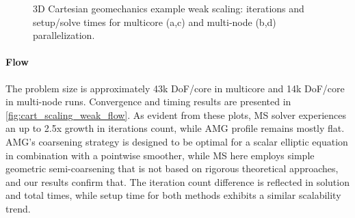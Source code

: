 \begin{figure} [htbp]
  \begin{subfigure}[t]{0.48\textwidth}
    \centering
    
    \caption{}
    \label{fig:cart_scaling_weak_mech_omp_iter}
  \end{subfigure}
  \hfill
  \begin{subfigure}[t]{0.48\textwidth}
    \centering
    
    \caption{}
    \label{fig:cart_scaling_weak_mech_mpi_iter}
  \end{subfigure}
  \par\bigskip 
  \begin{subfigure}[t]{0.48\textwidth}
    \centering
    
    \caption{}
    \label{fig:cart_scaling_weak_mech_omp_time}
  \end{subfigure}
  \hfill
  \begin{subfigure}[t]{0.48\textwidth}
    \centering
    
    \caption{}
    \label{fig:cart_scaling_weak_mech_mpi_time}
  \end{subfigure}
  \caption[3D Cartesian geomechanics example weak scaling]{3D Cartesian geomechanics example weak scaling: iterations and setup/solve times for multicore (a,c) and multi-node (b,d) parallelization.}
  \label{fig:cart_scaling_weak_mech}
\end{figure}

\paragraph{Flow}
The problem size is approximately 43k DoF/core in multicore and 14k DoF/core in multi-node runs.   Convergence and timing results are presented in \cref{fig:cart_scaling_weak_flow}.   As evident from these plots, MS solver experiences an up to 2.5x growth in iterations count, while AMG profile remains mostly flat.   AMG's coarsening strategy is designed to be optimal for a scalar elliptic equation in combination with a pointwise smoother, while MS here employs simple geometric semi-coarsening that is not based on rigorous theoretical approaches, and our results confirm that.   The iteration count difference is reflected in solution and total times, while setup time for both methods exhibits a similar scalability trend.

